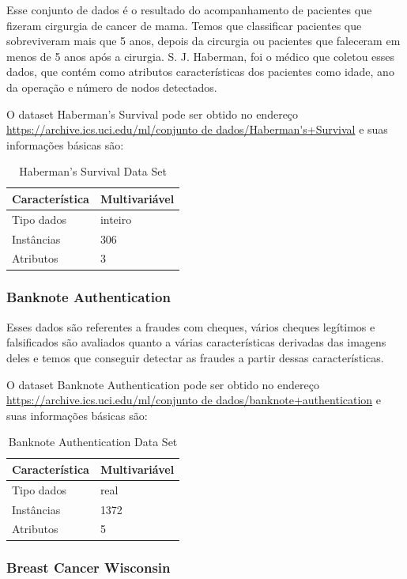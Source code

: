 \documentclass[12pt, a4paper]{article}
\begin{document}
Esse conjunto de dados é o resultado do acompanhamento de pacientes que fizeram cirgurgia de cancer de mama. Temos que classificar pacientes que sobreviveram mais que 5 anos, depois da circurgia ou pacientes que faleceram em menos de 5 anos após a cirurgia. S. J. Haberman, foi o médico que coletou esses dados, que contém como atributos características dos pacientes como idade, ano da operação e número de nodos detectados.

O dataset Haberman's Survival pode ser obtido no endereço \url{https://archive.ics.uci.edu/ml/conjunto de dados/Haberman's+Survival} e suas informações básicas são:
\begin{table}[!ht]
\centering
\caption{Haberman's Survival Data Set}
\label{habermanstable}
\begin{tabular}{|l|l|}
\hline
Característica & Multivariável\\
\hline
Tipo dados & inteiro\\
\hline
Instâncias & 306\\
\hline
Atributos & 3\\
\hline
\end{tabular}
\end{table}

\subsubsection{Banknote Authentication}

Esses dados são referentes a fraudes com cheques, vários cheques legítimos e falsificados são avaliados quanto a várias características derivadas das imagens deles e temos que conseguir detectar as fraudes a partir dessas características.

O dataset Banknote Authentication pode ser obtido no endereço \url{https://archive.ics.uci.edu/ml/conjunto de dados/banknote+authentication} e suas informações básicas são:
\begin{table}[!ht]
\centering
\caption{Banknote Authentication Data Set}
\label{banknotetable}
\begin{tabular}{|l|l|}
\hline
Característica & Multivariável\\
\hline
Tipo dados & real\\
\hline
Instâncias & 1372\\
\hline
Atributos & 5\\
\hline
\end{tabular}
\end{table}

\subsubsection{Breast Cancer Wisconsin}
\end{document}
